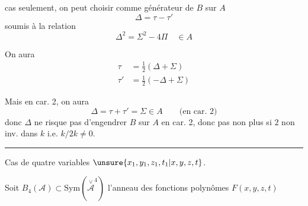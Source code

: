 cas seulement, on peut choisir comme générateur de $B$ sur $A$
\[
 \Delta=\tau-\tau'
\]
soumis à la relation
\[
 \Delta^2=\Sigma^2-4\Pi\quad\in A
\]

On aura
\[
 \begin{aligned}
 \tau&=\tfrac12(\Delta+\Sigma)\\
 \tau'&=\tfrac12(-\Delta+\Sigma)
 \end{aligned}
\]

Mais en car. 2, on aura
\[
 \Delta=\tau+\tau'=\Sigma\in A\qquad\text{(en car. 2)}
\]
donc $\Delta$ ne risque pas d'engendrer $B$ sur $A$ en car. 2, donc pas non plus si $2$ non inv. dans $k$ i.e. $k/2k\ne0$.

\begin{center}\rule{2.4cm}{0.3pt}\end{center}

Cas de quatre variables $\unsure{x_1,y_1,z_1,t_1|x,y,z,t}$.

Soit $B_4(\mathcal A)\subset\mathrm{Sym}(\overset{\vee}{\mathcal A}^{4})$ l'anneau des fonctions polynômes $F(x,y,z,t)$
